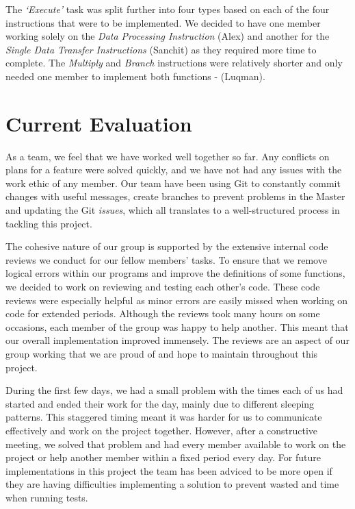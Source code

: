 \documentclass[10pt]{article}
\begin{document}
The \textsl{‘Execute’} task was split further into four types based on each of the four instructions that were to be
implemented. We decided to have one member working solely on the \textsl{Data Processing Instruction} (Alex) and another
for the \textsl{Single Data Transfer Instructions} (Sanchit) as they required more time to complete. The \textsl{Multiply} and \textsl{Branch}
instructions were relatively shorter and only needed one member to implement both functions - (Luqman).

\section*{Current Evaluation}
As a team, we feel that we have worked well together so far. Any conflicts on plans for a feature were solved
quickly, and we have not had any issues with the work ethic of any member. Our team have been using Git to
constantly commit changes with useful messages, create branches to prevent problems in the Master and
updating the Git \textsl{issues}, which all translates to a well-structured process in tackling this project.


The cohesive nature of our group is supported by the extensive internal code reviews we conduct for our
fellow members’ tasks. To ensure that we remove logical errors within our programs and improve the
definitions of some functions, we decided to work on reviewing and testing each other’s code. These code
reviews were especially helpful as minor errors are easily missed when working on code for extended periods.
Although the reviews took many hours on some occasions, each member of the group was happy to help
another. This meant that our overall implementation improved immensely. The reviews are an aspect of our
group working that we are proud of and hope to maintain throughout this project.


During the first few days, we had a small problem with the times each of us had started and ended their work
for the day, mainly due to different sleeping patterns. This staggered timing meant it was harder for us to
communicate effectively and work on the project together. However, after a constructive meeting, we solved
that problem and had every member available to work on the project or help another member within a fixed
period every day. For future implementations in this project the team has been adviced to be more open if they
are having difficulties implementing a solution to prevent wasted and time when running tests. 
\end{document}

